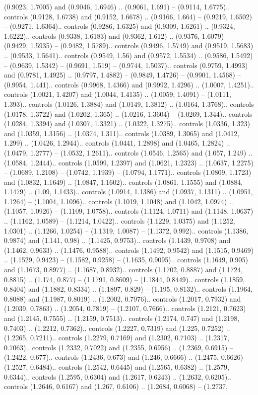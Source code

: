 (0.9023, 1.7005) and (0.9046, 1.6946) .. (0.9061, 1.691) -- (0.9114, 1.6775).. controls (0.9128, 1.6738) and (0.9152, 1.6678) .. (0.9166, 1.664) -- (0.9219, 1.6502) -- (0.9271, 1.6364).. controls (0.9286, 1.6325) and (0.9309, 1.6261) .. (0.9324, 1.6222).. controls (0.9338, 1.6183) and (0.9362, 1.612) .. (0.9376, 1.6079) -- (0.9429, 1.5935) -- (0.9482, 1.5789).. controls (0.9496, 1.5749) and (0.9519, 1.5683) .. (0.9533, 1.5641).. controls (0.9549, 1.56) and (0.9572, 1.5534) .. (0.9586, 1.5492) -- (0.9639, 1.5342) -- (0.9691, 1.519) -- (0.9744, 1.5037).. controls (0.9759, 1.4993) and (0.9781, 1.4925) .. (0.9797, 1.4882) -- (0.9849, 1.4726) -- (0.9901, 1.4568) -- (0.9954, 1.441).. controls (0.9968, 1.4366) and (0.9992, 1.4296) .. (1.0007, 1.4251).. controls (1.0021, 1.4207) and (1.0044, 1.4135) .. (1.0059, 1.4091) -- (1.0111, 1.393).. controls (1.0126, 1.3884) and (1.0149, 1.3812) .. (1.0164, 1.3768).. controls (1.0178, 1.3722) and (1.0202, 1.365) .. (1.0216, 1.3604) -- (1.0269, 1.344).. controls (1.0284, 1.3394) and (1.0307, 1.3321) .. (1.0322, 1.3275).. controls (1.0336, 1.323) and (1.0359, 1.3156) .. (1.0374, 1.311).. controls (1.0389, 1.3065) and (1.0412, 1.299) .. (1.0426, 1.2944).. controls (1.0441, 1.2898) and (1.0465, 1.2824) .. (1.0479, 1.2777) -- (1.0532, 1.2611).. controls (1.0546, 1.2565) and (1.057, 1.249) .. (1.0584, 1.2444).. controls (1.0599, 1.2397) and (1.0621, 1.2323) .. (1.0637, 1.2275) -- (1.0689, 1.2108) -- (1.0742, 1.1939) -- (1.0794, 1.1771).. controls (1.0809, 1.1723) and (1.0832, 1.1649) .. (1.0847, 1.1602).. controls (1.0861, 1.1555) and (1.0884, 1.1479) .. (1.09, 1.1433).. controls (1.0914, 1.1386) and (1.0937, 1.1311) .. (1.0951, 1.1264) -- (1.1004, 1.1096).. controls (1.1019, 1.1048) and (1.1042, 1.0974) .. (1.1057, 1.0926) -- (1.1109, 1.0758).. controls (1.1124, 1.0711) and (1.1148, 1.0637) .. (1.1162, 1.0589) -- (1.1214, 1.0422).. controls (1.1229, 1.0375) and (1.1252, 1.0301) .. (1.1266, 1.0254) -- (1.1319, 1.0087) -- (1.1372, 0.992).. controls (1.1386, 0.9874) and (1.141, 0.98) .. (1.1425, 0.9753).. controls (1.1439, 0.9708) and (1.1462, 0.9633) .. (1.1476, 0.9588).. controls (1.1492, 0.9542) and (1.1515, 0.9469) .. (1.1529, 0.9423) -- (1.1582, 0.9258) -- (1.1635, 0.9095).. controls (1.1649, 0.905) and (1.1673, 0.8977) .. (1.1687, 0.8932).. controls (1.1702, 0.8887) and (1.1724, 0.8815) .. (1.174, 0.877) -- (1.1791, 0.8609) -- (1.1844, 0.8449).. controls (1.1859, 0.8404) and (1.1882, 0.8334) .. (1.1897, 0.829) -- (1.195, 0.8132).. controls (1.1964, 0.8088) and (1.1987, 0.8019) .. (1.2002, 0.7976).. controls (1.2017, 0.7932) and (1.2039, 0.7863) .. (1.2054, 0.7819) -- (1.2107, 0.7666).. controls (1.2121, 0.7623) and (1.2145, 0.7555) .. (1.2159, 0.7513).. controls (1.2174, 0.747) and (1.2198, 0.7403) .. (1.2212, 0.7362).. controls (1.2227, 0.7319) and (1.225, 0.7252) .. (1.2265, 0.7211).. controls (1.2279, 0.7169) and (1.2302, 0.7103) .. (1.2317, 0.7063).. controls (1.2332, 0.7022) and (1.2355, 0.6956) .. (1.2369, 0.6915) -- (1.2422, 0.677).. controls (1.2436, 0.673) and (1.246, 0.6666) .. (1.2475, 0.6626) -- (1.2527, 0.6484).. controls (1.2542, 0.6445) and (1.2565, 0.6382) .. (1.2579, 0.6344).. controls (1.2595, 0.6304) and (1.2617, 0.6243) .. (1.2632, 0.6205).. controls (1.2646, 0.6167) and (1.267, 0.6106) .. (1.2684, 0.6068) -- (1.2737, 